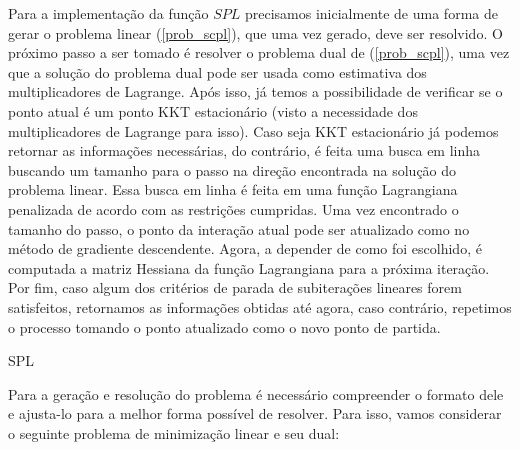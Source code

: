 Para a implementação da função \(SPL\) precisamos inicialmente de uma forma de gerar o problema linear
(\ref{prob_scpl}), que uma vez gerado, deve ser resolvido. O próximo passo a ser tomado é resolver
o problema dual de (\ref{prob_scpl}), uma vez que a solução do problema dual pode ser usada como estimativa
dos multiplicadores de Lagrange. Após isso, já temos a possibilidade de verificar se o ponto atual é um
ponto KKT estacionário (visto a necessidade dos multiplicadores de Lagrange para isso). Caso seja KKT
estacionário já podemos retornar as informações necessárias, do contrário, é feita uma busca em linha
buscando um tamanho para o passo na direção encontrada na solução do problema linear. Essa busca em
linha é feita em uma função Lagrangiana penalizada de acordo com as restrições cumpridas. Uma vez
encontrado o tamanho do passo, o ponto da interação atual pode ser atualizado como no método de gradiente
descendente. Agora, a depender de como foi escolhido, é computada a matriz Hessiana da função Lagrangiana
para a próxima iteração. Por fim, caso algum dos critérios de parada de subiterações lineares forem
satisfeitos, retornamos as informações obtidas até agora, caso contrário, repetimos o processo tomando
o ponto atualizado como o novo ponto de partida.


\vspace{15pt}
\begin{algorithm}[H]
  \SetAlgoLined
  \caption{SPL}
\end{algorithm}
\vspace{15pt}


Para a geração e resolução do problema é necessário compreender o formato dele e ajusta-lo
para a melhor forma possível de resolver. Para isso, vamos considerar o seguinte problema
de minimização linear e seu dual:

